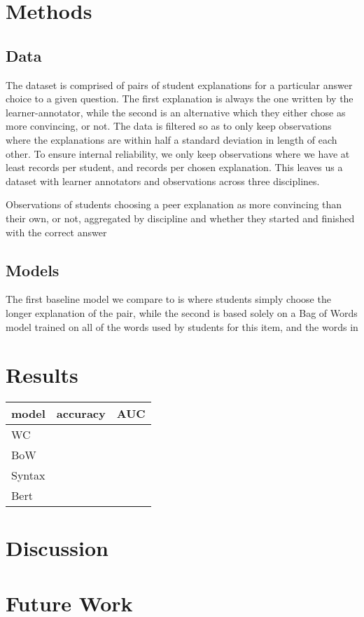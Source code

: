 \documentclass[runningheads]{llncs}
\begin{document}
\section{Methods}

\subsection{Data}
The dataset is comprised of pairs of student explanations for a particular 
answer choice to a given question. The first explanation is always the one 
written by the learner-annotator, while the second is an alternative which 
they either chose as more convincing, or not. The data is filtered so as 
to only keep observations where the explanations are within half a standard 
deviation in length of each other. To ensure internal reliability, we only keep 
observations where we have at least  
records per 
student, and  records per chosen 
explanation. This leaves us a dataset with  
learner annotators and  observations across three disciplines.
\begin{table}

\caption{Observations of students choosing a peer explanation as more 
convincing than their own, or not, aggregated by discipline and whether they 
started and finished with the correct answer}
\end{table}

\subsection{Models}
The first baseline model we compare to is where students simply choose the 
longer explanation of the pair, while the second is based solely on a Bag of 
Words model trained on all of the words used by students for this item, and the 
words in 


\section{Results}
\begin{table}
	\begin{tabular}{l|l|l}
		\toprule
		model & accuracy & AUC \\
		\toprule
		WC &  &  \\
		BoW &  &  \\
		Syntax & & \\
		Bert &  &  \\	
	\end{tabular}
\end{table}
\section{Discussion}

\section{Future Work}

 
 
\end{document}
